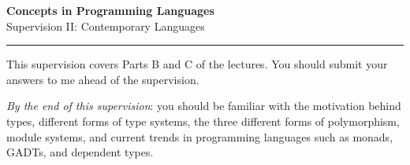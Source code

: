 \documentclass{supervision}
\begin{document}
	
\newcommand{\course}{Concepts in Programming Languages}
\newcommand{\week}{II}
\newcommand{\topics}{}

\begin{center}
\LARGE {\textbf{\color{campurpledark} \course} }\\[-0.2cm]
\Large \color{campurpledark} Supervision \week: Contemporary Languages %
\end{center}

{\color{campurple}\hrule}

\newcommand{\terminal}[1]{\texttt{\color{campurple}#1}}
\newcommand{\bl}[1]{{\color{black}#1}}

\vspace{0.5cm}

This supervision covers Parts B and C of the lectures. You should submit your answers to me ahead of the supervision.

\emph{By the end of this supervision}: you should be familiar with the motivation behind types, different forms of type systems, the three different forms of polymorphism, module systems, and current trends in programming languages such as monads, GADTs, and dependent types.
\end{document}
